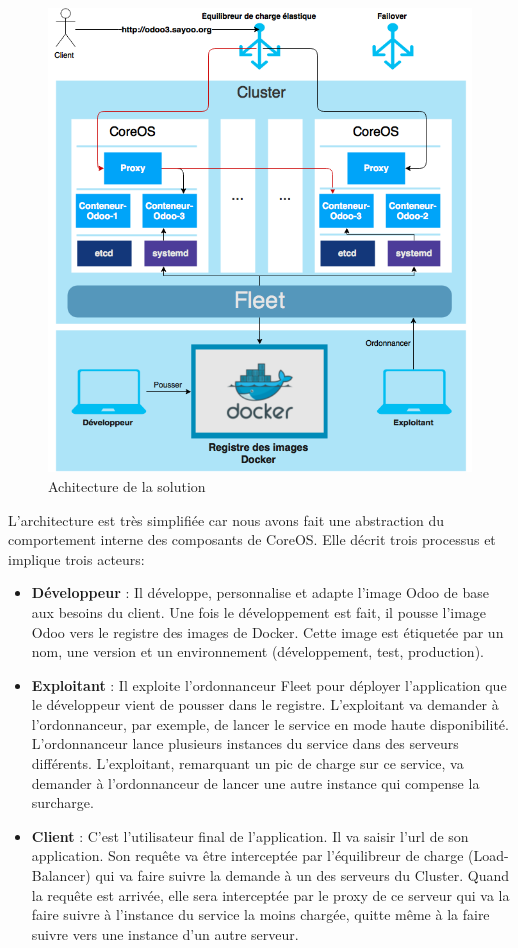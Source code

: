 \begin{onehalfspace}
\begin{figure}[H]
\centering
\includegraphics [scale=0.7]{chapitre4/assets/architecture}
\caption{Achitecture de la solution}
\label{fig:architecture}
\end{figure}

L'architecture est très simplifiée car nous avons fait une abstraction du comportement interne des composants de CoreOS. Elle décrit trois processus et implique trois acteurs:


\begin{itemize}
 	\item \textbf{Développeur} : Il développe, personnalise et adapte l'image Odoo de base aux besoins du client. Une fois le développement est fait, il pousse l'image Odoo vers le registre des images de Docker. Cette image est étiquetée par un nom, une version et un environnement (développement, test, production).
 	\item \textbf{Exploitant} : Il exploite l'ordonnanceur Fleet pour déployer l'application que le développeur vient de pousser dans le registre. L'exploitant va demander à l'ordonnanceur, par exemple, de lancer le service en mode haute disponibilité. L'ordonnanceur lance plusieurs instances du service dans des serveurs différents. L'exploitant, remarquant un pic de charge sur ce service, va demander à l'ordonnanceur de lancer une autre instance qui compense la surcharge.
 	\item \textbf{Client} : C'est l'utilisateur final de l'application. Il va saisir l'\acrshort{url} de son application. Son requête va être interceptée par l'équilibreur de charge (Load-Balancer) qui va faire suivre la demande à un des serveurs du Cluster. Quand la requête est arrivée, elle sera interceptée par le proxy de ce serveur qui va la faire suivre à l'instance du service la moins chargée, quitte même à la faire suivre vers une instance d'un autre serveur.
 \end{itemize} 



\end{onehalfspace}

